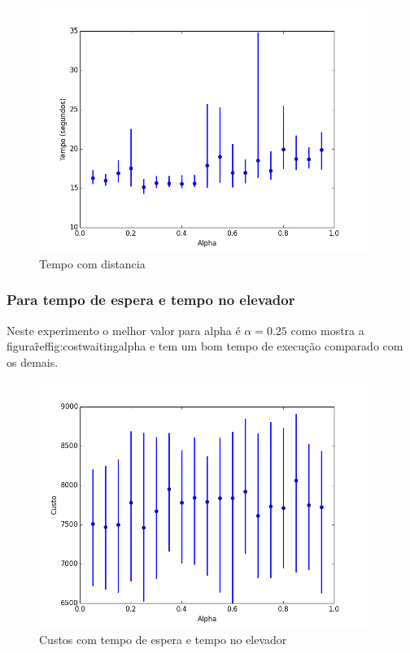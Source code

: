 		\begin{figure}[H]
			\centering
			\includegraphics[height=8cm]{images/time_distance_alpha}
			\caption{Tempo com distancia}
			\label{fig:timedistancealpha}
		\end{figure}
		
	\subsubsection{Para tempo de espera e tempo no elevador}
		Neste experimento o melhor valor para alpha é $\alpha = 0.25$ como mostra a figura\~ref{fig:costwaitingalpha} e tem um bom tempo de execução comparado com os demais.
		\begin{figure}[H]
			\centering
			\includegraphics[height=8cm]{images/cost_waitingTime_alpha}
			\caption{Custos com tempo de espera e tempo no elevador}
			\label{fig:costwaitingalpha}
		\end{figure}
		
